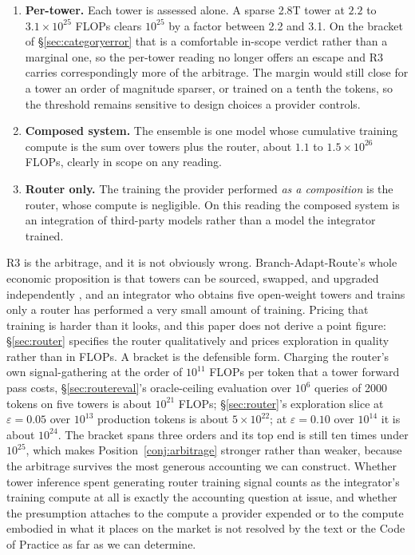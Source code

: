 \documentclass[11pt]{article}
\begin{document}
\begin{enumerate}[label=(R\arabic*),itemsep=3pt]
\item \textbf{Per-tower.} Each tower is assessed alone. A sparse 2.8T tower at $2.2$ to $3.1\times10^{25}$ FLOPs clears $10^{25}$ by a factor between 2.2 and 3.1. On the bracket of \S\ref{sec:categoryerror} that is a comfortable in-scope verdict rather than a marginal one, so the per-tower reading no longer offers an escape and R3 carries correspondingly more of the arbitrage. The margin would still close for a tower an order of magnitude sparser, or trained on a tenth the tokens, so the threshold remains sensitive to design choices a provider controls.
\item \textbf{Composed system.} The ensemble is one model whose cumulative training compute is the sum over towers plus the router, about $1.1$ to $1.5\times10^{26}$ FLOPs, clearly in scope on any reading.
\item \textbf{Router only.} The training the provider performed \emph{as a composition} is the router, whose compute is negligible. On this reading the composed system is an integration of third-party models rather than a model the integrator trained.
\end{enumerate}

R3 is the arbitrage, and it is not obviously wrong. Branch-Adapt-Route's whole economic proposition is that towers can be sourced, swapped, and upgraded independently \cite{morrison2026bar}, and an integrator who obtains five open-weight towers and trains only a router has performed a very small amount of training. Pricing that training is harder than it looks, and this paper does not derive a point figure: \S\ref{sec:router} specifies the router qualitatively and prices exploration in quality rather than in FLOPs. A bracket is the defensible form. Charging the router's own signal-gathering at the order of $10^{11}$ FLOPs per token that a tower forward pass costs, \S\ref{sec:routereval}'s oracle-ceiling evaluation over $10^6$ queries of 2000 tokens on five towers is about $10^{21}$ FLOPs; \S\ref{sec:router}'s exploration slice at $\varepsilon = 0.05$ over $10^{13}$ production tokens is about $5\times10^{22}$; at $\varepsilon = 0.10$ over $10^{14}$ it is about $10^{24}$. The bracket spans three orders and its top end is still ten times under $10^{25}$, which makes Position~\ref{conj:arbitrage} stronger rather than weaker, because the arbitrage survives the most generous accounting we can construct. Whether tower inference spent generating router training signal counts as the integrator's training compute at all is exactly the accounting question at issue, and whether the presumption attaches to the compute a provider expended or to the compute embodied in what it places on the market is not resolved by the text or the Code of Practice as far as we can determine.
\end{document}
